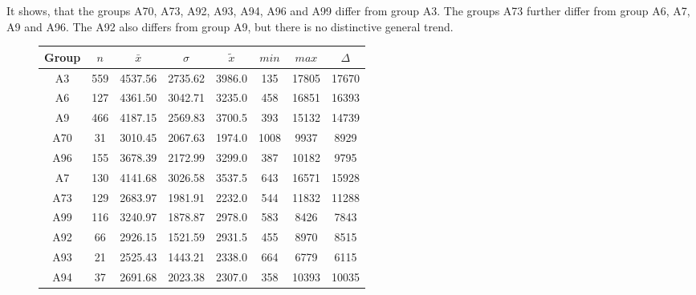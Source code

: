 It shows, that the groups A70, A73, A92, A93, A94, A96 and A99 differ from group A3. The groups A73 further differ from group A6, A7, A9 and A96. The A92 also differs from group A9, but there is no distinctive general trend.
\begin{figure}[ht!]
	\centering
	\begin{minipage}{0.5\textwidth}
		\tiny
		\setlength{\tabcolsep}{4pt}
		\centering
		\begin{tabular}{c|c|c|c|c|c|c|c}
			\toprule
			Group & $n$ & $\bar{x}$ & $\sigma$ & $\tilde{x}$ & $min$ & $max$ & $\Delta$ \\
			\midrule
			A3  & 559 & 4537.56 & 2735.62 & 3986.0 & 135  & 17805 & 17670 \\ 
			A6  & 127 & 4361.50 & 3042.71 & 3235.0 & 458  & 16851 & 16393 \\ 
			A9  & 466 & 4187.15 & 2569.83 & 3700.5 & 393  & 15132 & 14739 \\ 
			A70 & 31  & 3010.45 & 2067.63 & 1974.0 & 1008 & 9937  & 8929 \\ 
			A96 & 155 & 3678.39 & 2172.99 & 3299.0 & 387  & 10182 & 9795 \\ 
			A7  & 130 & 4141.68 & 3026.58 & 3537.5 & 643  & 16571 & 15928 \\ 
			A73 & 129 & 2683.97 & 1981.91 & 2232.0 & 544  & 11832 & 11288 \\ 
			A99 & 116 & 3240.97 & 1878.87 & 2978.0 & 583  & 8426  & 7843 \\ 
			A92 & 66  & 2926.15 & 1521.59 & 2931.5 & 455  & 8970  & 8515 \\ 
			A93 & 21  & 2525.43 & 1443.21 & 2338.0 & 664  & 6779  & 6115 \\ 
			A94 & 37  & 2691.68 & 2023.38 & 2307.0 & 358  & 10393 & 10035 \\ 
			\bottomrule
		\end{tabular}
		\label{tbl:descriptives_baysis_matched_Str_SAvg}
	\end{minipage}%
	\begin{minipage}{0.55\textwidth}
\end{minipage}
\end{figure}
